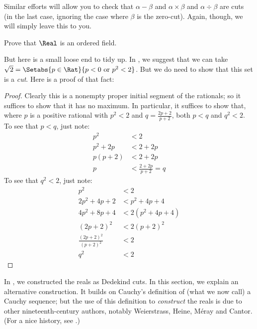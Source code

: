 Similar efforts will allow you to check that $\alpha - \beta$ and
$\alpha \times \beta$ and $\alpha \div \beta$ are cuts (in the last
case, ignoring the case where $\beta$ is the zero-cut). Again, though,
we will simply leave this to you. 

\begin{prob}
Prove that $\Real$ is an ordered field.
\end{prob}

But here is a small loose end to tidy up. In
, we suggest that we can take $\sqrt{2} =
\Setabs{p \in \Rat}{p < 0 \text{ or }p^2 < 2}$. But we do need to show
that this set is a \emph{cut}. Here is a proof of that fact:

\begin{proof}
Clearly this is a nonempty proper initial segment of the rationals; so
it suffices to show that it has no maximum. In particular, it suffices
to show that, where $p$ is a positive rational with $p^2 < 2$ and $q =
\frac{2p+2}{p+2}$, both $p < q$ and $q^2 < 2$. To see that $p < q$,
just note:
\begin{align*}
	p^2 &< 2\\
	p^2 + 2p &< 2 + 2p\\
	p(p + 2) &< 2 + 2p\\
	p &< \tfrac{2+2p}{p+2} = q
\end{align*}
To see that $q^2 < 2$, just note:
\begin{align*}
	p^2 &< 2\\
	2p^2 + 4p + 2 &< p^2 + 4p+ 4\\
	4p^2 + 8p + 4 &< 2(p^2 + 4p + 4)\\
	(2p+2)^2 & <2(p+2)^2\\
	\tfrac{(2p+2)^2}{(p+2)^2} &< 2\\
	q^2 &< 2
\end{align*}
\end{proof}





In , we constructed the reals as Dedekind cuts. In
this section, we explain an alternative construction. It builds on
Cauchy's definition of (what we now call) a Cauchy sequence; but the
use of this definition to \emph{construct} the reals is due to other
nineteenth-century authors, notably Weierstrass, Heine, M\'{e}ray and
Cantor. (For a nice history, see \citeauthor{OConnorRobertson:RN}
\citeyear{OConnorRobertson:RN}.)

